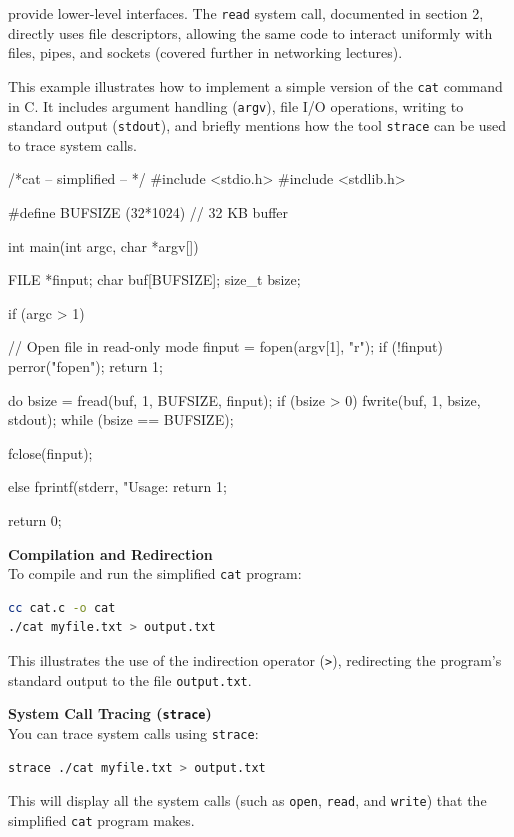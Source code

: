 \documentclass[../../compsys.tex]{subfiles}
\begin{document}
provide lower-level interfaces. The \texttt{read} system call, documented in section 2, directly uses file descriptors, allowing the same code to interact uniformly with files, pipes, and sockets (covered further in networking lectures).\newpage
\begin{example}
\leavevmode
\upshape
This example illustrates how to implement a simple version of the \texttt{cat} command in C. It includes argument handling (\texttt{argv}), file I/O operations, writing to standard output (\texttt{stdout}), and briefly mentions how the tool \texttt{strace} can be used to trace system calls.

\begin{cc}
/*cat -- simplified -- */
#include <stdio.h>
#include <stdlib.h>

#define BUFSIZE (32*1024) // 32 KB buffer

int main(int argc, char *argv[]) {
    FILE *finput;
    char buf[BUFSIZE];
    size_t bsize;

    if (argc > 1) {
        // Open file in read-only mode
        finput = fopen(argv[1], "r");
        if (!finput) {
            perror("fopen");
            return 1;
        }

        do {
            bsize = fread(buf, 1, BUFSIZE, finput);
            if (bsize > 0)
                fwrite(buf, 1, bsize, stdout);
        } while (bsize == BUFSIZE);

        fclose(finput);
    } else {
        fprintf(stderr, "Usage: %
        return 1;
    }

    return 0;
}
\end{cc}
\textbf{Compilation and Redirection}\\
To compile and run the simplified \texttt{cat} program:

\begin{lstlisting}[language=bash]
cc cat.c -o cat
./cat myfile.txt > output.txt
\end{lstlisting}

This illustrates the use of the indirection operator (\texttt{>}), redirecting the program's standard output to the file \texttt{output.txt}.

\textbf{System Call Tracing (\texttt{strace})}\\
You can trace system calls using \texttt{strace}:
\begin{lstlisting}[language=bash]
strace ./cat myfile.txt > output.txt
\end{lstlisting}
This will display all the system calls (such as \texttt{open}, \texttt{read}, and \texttt{write}) that the simplified \texttt{cat} program makes.
\end{example}
\newpage
\end{document}
